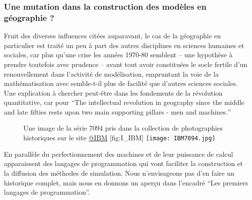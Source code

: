 \subsubsection{Une mutation dans la construction des modèles en géographie ?}
\label{ssec:crise_mutation}

Fruit des diverses influences citées auparavant, le cas de la géographie en particulier est traité un peu à part des autres disciplines en sciences humaines et sociales, car plus qu'une crise les années 1970-80 semblent -- une hypothèse à prendre toutefois avec prudence -- avant tout avoir constituées le socle fertile d'un renouvellement dans l'activité de modélisation, empruntant la voie de la mathématisation avec semble-t-il plus de facilité que d'autres sciences sociales. Une explication à chercher peut-être dans les fondements de la révolution quantitative, car pour \textcite{Gould1970} \foreignquote{english}{The intellectual revolution in geography since the middle and late fifties rests upon two main supporting pillars - men and machines.}

\begin{figure}[h]
\begin{sidecaption}[fortoc]{Une image de la série 7094 pris dans la collection de photographies historiques sur le site \href{http://www-03.ibm.com/ibm/history/exhibits/mainframe/mainframe_album.html}{@IBM} }[fig:I_IBM]
  \centering
 \texttt{[image: IBM7094.jpg]}
  \end{sidecaption}
\end{figure}

En parallèle du perfectionnement des machines et de leur puissance de calcul apparaissent des langages de programmation qui vont faciliter la construction et la diffusion des méthodes de simulation. Nous n'envisageons pas d'en faire un historique complet, mais nous en donnons un aperçu dans l'encadré \enquote{Les premiers langages de programmation}.

